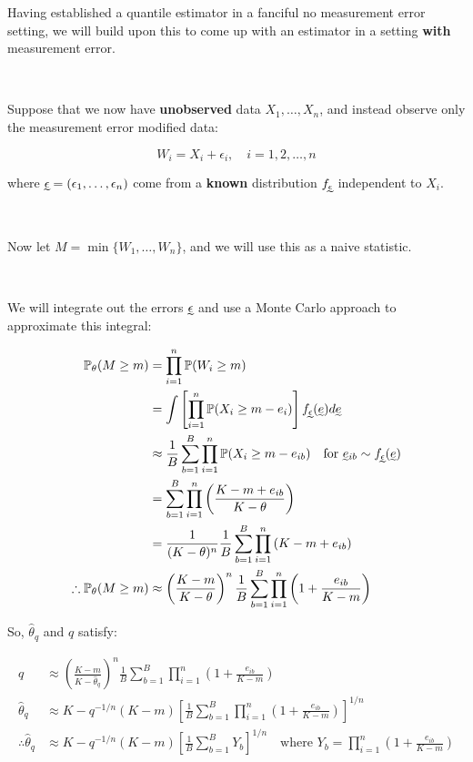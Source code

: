 Having established a quantile estimator in a fanciful no measurement error setting, we will build upon this to come up with an estimator in a setting \textbf{with} measurement error.

\

Suppose that we now have \textbf{unobserved} data $X_1, \dots, X_n$, and instead observe only the measurement error modified data:

\[
W_i = X_i + \epsilon_i, \quad i = 1, 2, \dots, n
\]

where $\undertilde{\epsilon} = (\epsilon_1, \dots, \epsilon_n)$ come from a \textbf{known} distribution $f_{\undertilde{\epsilon}}$ independent to $X_i$.

\

Now let $M = \min{\{W_1, \dots, W_n\}}$, and we will use this as a naive statistic.

\

We will integrate out the errors $\undertilde{\epsilon}$ and use a Monte Carlo approach to approximate this integral:

\begin{align*}
    \PP_\theta (M \geq m) &= \prod_{i=1}^n \PP(W_i \geq m) \\
    &= \int \left[ \prod_{i=1}^n \PP(X_i \geq m - e_{i}) \right] f_{\undertilde{\epsilon}}(\undertilde{e}) d\undertilde{e} \\
    &\approx \frac{1}{B} \sum_{b=1}^B \prod_{i=1}^n \PP(X_i \geq m - e_{ib}) \quad \text{for $\undertilde{e}_{ib} \sim f_{\undertilde{\epsilon}}(\undertilde{e})$}\\
    &= \sum_{b=1}^B \prod_{i=1}^n \left( \frac{K - m + e_{ib}}{K - \theta} \right) \\
    &= \frac{1}{(K - \theta)^n}\frac{1}{B} \sum_{b=1}^B \prod_{i=1}^n \left( K - m + e_{ib} \right) \\
    \therefore \PP_\theta (M \geq m) &\approx \left(\frac{K - m}{K - \theta} \right)^n \frac{1}{B} \sum_{b=1}^B \prod_{i=1}^n \left( 1 + \frac{e_{ib}}{K - m} \right)
\end{align*}


So, $\hat{\theta}_q$ and $q$ satisfy:

\begin{align*}
    q &\approx \left(\frac{K - m}{K - \hat{\theta}_q} \right)^n \frac{1}{B} \sum_{b=1}^B \prod_{i=1}^n \left( 1 + \frac{e_{ib}}{K - m} \right) \\ 
    \hat{\theta}_q &\approx K - q^{-1/n} (K - m) \left[ \frac{1}{B} \sum_{b=1}^B \prod_{i=1}^n \left( 1 + \frac{e_{ib}}{K - m} \right) \right]^{1/n} \\
    \therefore \hat{\theta}_q &\approx K - q^{-1/n} (K - m) \left[ \frac{1}{B} \sum_{b=1}^B Y_b \right]^{1/n} \quad \text{where $Y_b = \prod_{i=1}^n \left( 1 + \frac{e_{ib}}{K - m} \right) $}\\ 
\end{align*}

